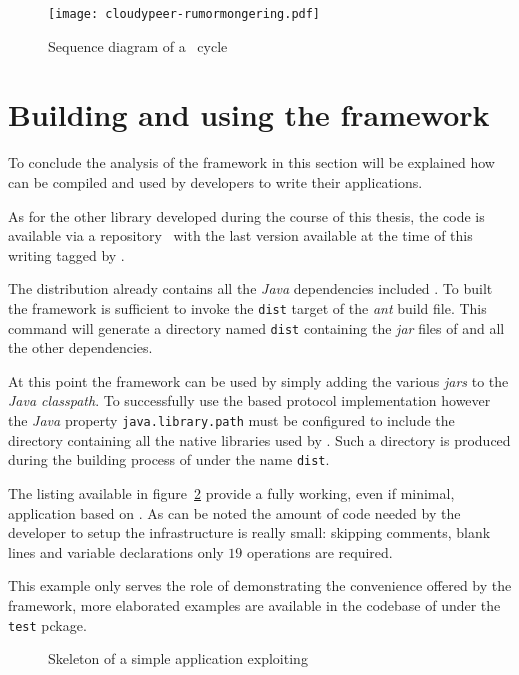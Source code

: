 \begin{figure}[H]
  \centering
  \texttt{[image: cloudypeer-rumormongering.pdf]}
  \caption{Sequence diagram of a \rumormongering\ cycle}
  \label{fig:cloudypeer-sequence-rumormongering}
\end{figure}

\clearpage
\section{Building and using the framework}
To conclude the analysis of the framework in this section will be
explained how \cloudypeer can be compiled and used by developers to
write their \ptop applications.

As for the other library developed during the course of this thesis,
the code is available via a \github repository~\cite{cloudypeer-repo}
with the last version available at the time of this writing tagged
by \thesistag.

The distribution already contains all the \textit{Java} dependencies
included \jgrapes. To built the framework is sufficient to invoke the
\texttt{dist} target of the \textit{ant} build file. This command will
generate a directory named \texttt{dist} containing the \textit{jar}
files of \cloudypeer and all the other dependencies.

At this point the framework can be used by simply adding the various
\textit{jars} to the \textit{Java classpath}. To successfully use the
\jgrapes based \peersampling protocol implementation however the
\textit{Java} property \texttt{java.library.path} must be configured
to include the directory containing all the native libraries used by
\jgrapes. Such a directory is produced during the building process of
\jgrapes under the name \texttt{dist}.

The listing available in figure~\ref{lst:cloudypeer-example-app}
provide a fully working, even if minimal, application based on \cloudypeer.
As can be noted the amount of code needed by the developer to setup
the \cloudcast infrastructure is really small: skipping comments,
blank lines and variable declarations only $19$ operations are
required.

This example only serves the role of demonstrating the convenience
offered by the framework, more elaborated examples are available in
the codebase of \cloudypeer under the \texttt{test} pckage.

\begin{figure}[H]
  
  \hspace{-100pt}
  \caption{Skeleton of a simple application exploiting \cloudypeer}
  \label{lst:cloudypeer-example-app}
\end{figure}

